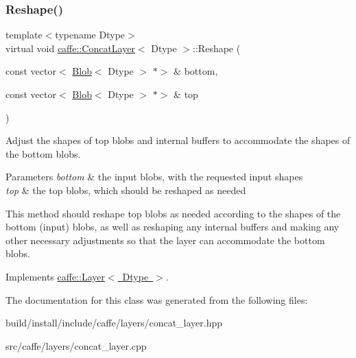 \mbox{\label{classcaffe_1_1_concat_layer_af210770b1c8bbce8fc34340ba94f9f75}} 
\subsubsection{\texorpdfstring{Reshape()}{Reshape()}\hspace{0.1cm}{\footnotesize\ttfamily [2/2]}}
{\footnotesize\ttfamily template$<$typename Dtype$>$ \\
virtual void \mbox{\hyperlink{classcaffe_1_1_concat_layer}{caffe\+::\+Concat\+Layer}}$<$ Dtype $>$\+::Reshape (\begin{DoxyParamCaption}\item[{const vector$<$ \mbox{\hyperlink{classcaffe_1_1_blob}{Blob}}$<$ Dtype $>$ $\ast$$>$ \&}]{bottom,  }\item[{const vector$<$ \mbox{\hyperlink{classcaffe_1_1_blob}{Blob}}$<$ Dtype $>$ $\ast$$>$ \&}]{top }\end{DoxyParamCaption})\hspace{0.3cm}{\ttfamily [virtual]}}



Adjust the shapes of top blobs and internal buffers to accommodate the shapes of the bottom blobs. 


\begin{DoxyParams}{Parameters}
{\em bottom} & the input blobs, with the requested input shapes \\
\hline
{\em top} & the top blobs, which should be reshaped as needed\\
\hline
\end{DoxyParams}
This method should reshape top blobs as needed according to the shapes of the bottom (input) blobs, as well as reshaping any internal buffers and making any other necessary adjustments so that the layer can accommodate the bottom blobs. 

Implements \mbox{\hyperlink{classcaffe_1_1_layer_a7fe981e8af8d93d587acf2a952be563d}{caffe\+::\+Layer$<$ Dtype $>$}}.



The documentation for this class was generated from the following files\+:\begin{DoxyCompactItemize}
\item 
build/install/include/caffe/layers/concat\+\_\+layer.\+hpp\item 
src/caffe/layers/concat\+\_\+layer.\+cpp\end{DoxyCompactItemize}
